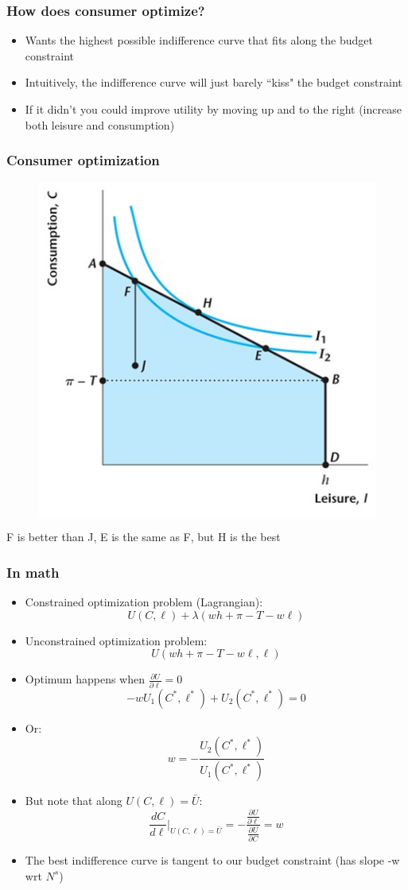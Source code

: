 \documentclass{beamer}
\begin{document}
\begin{frame}
\frametitle[alignment=center]{How does consumer optimize?}
\begin{itemize}
\item Wants the highest possible indifference curve that fits along the budget constraint
\bigskip
\item Intuitively, the indifference curve will just barely ``kiss" the budget constraint
\bigskip
\item If it didn't you could improve utility by moving up and to the right (increase both leisure and consumption)
\end{itemize}
\end{frame}

\begin{frame}
\frametitle[alignment=center]{Consumer optimization}
\begin{figure}
\centering
\includegraphics[scale=0.5]{Figures/W_Fig_4pt5.png}
\end{figure}
F is better than J, E is the same as F, but H is the best
\end{frame}

\begin{frame}
\frametitle[alignment=center]{In math}
\begin{itemize}
\item Constrained optimization problem (Lagrangian):
$$U(C,\ell)+\lambda(wh+\pi-T-w\ell)$$
\item Unconstrained optimization problem:
$$U(wh+\pi-T-w\ell,\ell)$$
\item Optimum happens when $\frac{\partial U}{\partial \ell}=0$
$$-wU_1(C^*,\ell^*)+U_2(C^*,\ell^*)=0$$
\item Or:
$$w=-\frac{U_2(C^*,\ell^*)}{U_1(C^*,\ell^*)}$$
\item But note that along $U(C,\ell)=\bar{U}$:
$$\frac{d C}{d \ell}|_{U(C,\ell)=\bar{U}}=-\frac{\frac{\partial U}{\partial \ell} }{\frac{\partial U}{\partial C}}=w$$
\item The best indifference curve is tangent to our budget constraint (has slope -w wrt $N^s$)
\end{itemize}
\end{frame}
\end{document}
